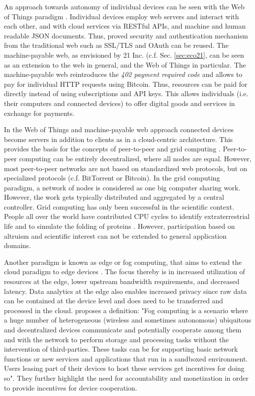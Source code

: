 An approach towards autonomy of individual devices can be seen with the Web of Things paradigm \parencite{Guinard2011}. Individual devices employ web servers and interact with each other, and with cloud services via \ac{REST}ful \ac{API}s, and machine and human readable \ac{JSON} documents. Thus, proved security and authentication mechanism from the traditional web such as \ac{SSL}/\ac{TLS} and OAuth \parencite{Leiba2012} can be reused. The machine-payable web, as envisioned by 21 Inc. (c.f. Sec. \ref{sec:eco21}, can be seen as an extension to the web in general, and the Web of Things in particular. The machine-payable web reintroduces the \emph{402 payment required code} and allows to pay for individual \ac{HTTP} requests using Bitcoin. Thus, resources can be paid for directly instead of using subscriptions and \ac{API} keys. This allows individuals (i.e. their computers and connected devices) to offer digital goods and services in exchange for payments.

In the Web of Things and machine-payable web approach connected devices become servers in addition to clients as in a cloud-centric architecture. This provides the basis for the concepts of peer-to-peer \parencite{Rodrigues:2010:PS:1831407.1831427} and grid computing \parencite{Anderson2004boinc}. Peer-to-peer computing can be entirely decentralized, where all nodes are equal. However, most peer-to-peer networks are not based on standardized web protocols, but on specialized protocols (c.f. BitTorrent or Bitcoin). In the grid computing paradigm, a network of nodes is considered as one big computer sharing work. However, the work gets typically distributed and aggregated by a central controller. Grid computing has only been successful in the scientific context. People all over the world have contributed CPU cycles to identify extraterrestrial life \parencite{Anderson:2002:SEP:581571.581573} and to simulate the folding of proteins \parencite{Beberg2009Folding}. However, participation based on altruism and scientific interest can not be extended to general application domains.   

Another paradigm is known as edge or fog computing, that aims to extend the cloud paradigm to edge devices \parencite{Bonomi:2012:FCR:2342509.2342513,ISI:000343986300007,Yi:2015:SFC:2757384.2757397}. The focus thereby is in increased utilization of resources at the edge, lower upstream bandwidth requirements, and decreased latency. Data analytics at the edge also enables increased privacy since raw data can be contained at the device level and does need to be transferred and processed in the cloud. \cite{ISI:000343986300007} proposes a definition: "Fog computing is a scenario where a huge number of heterogeneous (wireless and sometimes autonomous) ubiquitous and decentralized devices communicate and potentially cooperate among them and with the network to perform storage and processing tasks without the intervention of third-parties. These tasks can be for supporting basic network functions or new services and applications that run in a sandboxed environment. Users leasing part of their devices to host these services get incentives for doing so". They further highlight the need for accountability and monetization in order to provide incentives for device cooperation. 

